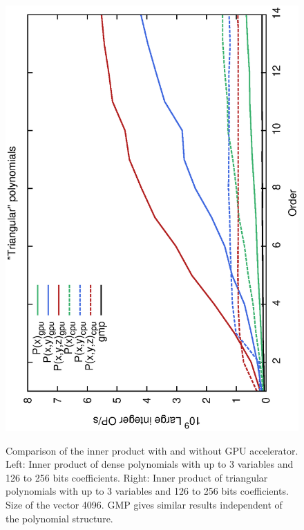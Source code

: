 \documentclass[oribibl,a4paper]{llncs2e/llncs}
\begin{document}
\begin{itemize}
\begin{figure}[t!]
{        \hspace{-0.4cm}
        \includegraphics[scale=0.37, angle=-90]{MC128.eps} 
    }
    \caption{Comparison of the inner product with and without GPU accelerator. Left: Inner product of dense polynomials with up to 3 variables and 126 to 256 bits coefficients. Right: Inner product of triangular polynomials with up to 3 variables and 126 to 256 bits coefficients. Size of the vector 4096. GMP gives similar results independent of the polynomial structure.}
    \label{ResME}
\end{figure}


\end{itemize}
\end{document}
